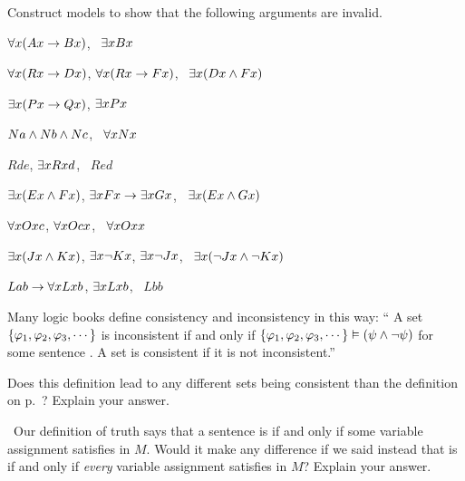 \problempart
Construct models to show that the following arguments are invalid.
\begin{earg}
\item $\forall x(Ax \rightarrow Bx)$, \therefore\ $\exists x Bx$
\item $\forall x(Rx \rightarrow Dx)$, $\forall x(Rx \rightarrow Fx)$, \therefore\ $\exists x(Dx \wedge Fx)$
\item $\exists x(Px\rightarrow Qx)$, \therefore $\exists x Px$
\item $Na \wedge Nb \wedge Nc$, \therefore\ $\forall x Nx$
\item $Rde$, $\exists x Rxd$, \therefore\ $Red$
\item $\exists x(Ex \wedge Fx)$, $\exists x Fx \rightarrow \exists x Gx$, \therefore\ $\exists x(Ex \wedge Gx)$
\item $\forall x Oxc$, $\forall x Ocx$, \therefore\ $\forall x Oxx$
\item $\exists x(Jx \wedge Kx)$, $\exists x \neg Kx$, $\exists x \neg Jx$, \therefore\ $\exists x(\neg Jx \wedge \neg Kx)$
\item $Lab \rightarrow \forall x Lxb$, $\exists x Lxb$, \therefore\ $Lbb$
\end{earg}





\problempart
\label{pr.SemanticsEssay}
\begin{earg}
\item Many logic books define consistency and inconsistency in this way:
`` A set $\{\varphi{}_1,\varphi{}_2,\varphi{}_3,\cdots\}$ is inconsistent if and only if $\{\varphi{}_1,\varphi{}_2,\varphi{}_3,\cdots\}\vDash(\psi{}\wedge\neg\psi{})$ for some sentence \metaB{}. A set is consistent if it is not inconsistent.''

Does this definition lead to any different sets being consistent than the definition on  p.~\pageref{def.consistency$\PL$}? Explain your answer.

\item\leftsolutions\ Our definition of truth says that a sentence \metaA{} is   if and only if some variable assignment satisfies \metaA{} in $M$. Would it make any difference if we said instead that \metaA{} is   if and only if \emph{every} variable assignment satisfies \metaA{} in $M$? Explain your answer.
\end{earg}

\fi
